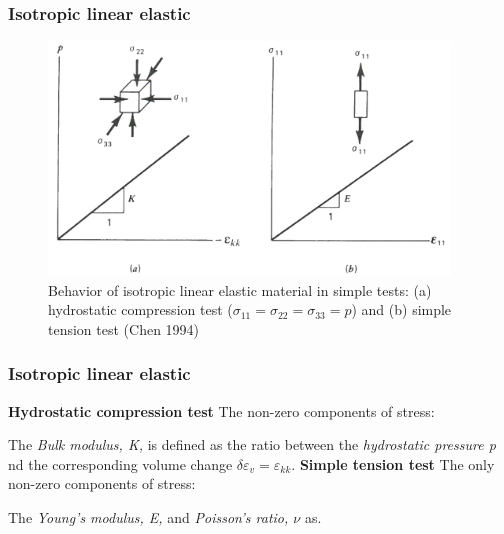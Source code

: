 \documentclass[notes]{beamer}
\begin{document}
\begin{frame}
\frametitle{Isotropic linear elastic}
	\begin{figure}
		\includegraphics[width=0.95\textwidth]{figs/isotropic-linear-elastic.png}
		\caption*{Behavior of isotropic linear elastic material in simple tests: (a) hydrostatic compression test ($\sigma_{11} = \sigma_{22} = \sigma_{33} = p$) and (b) simple tension test (Chen 1994)}
	\end{figure}
\end{frame}

\begin{frame}
\frametitle{Isotropic linear elastic}
\textbf{Hydrostatic compression test}
The non-zero components of stress: 

The \textit{Bulk modulus, K,}  is defined as the ratio between the \textit{hydrostatic pressure p} nd the corresponding volume change $\delta \varepsilon_v = \varepsilon_{kk}$. 
\textbf{Simple tension test}
The only non-zero components of stress: 

The \textit{Young's modulus, E,}  and \textit{Poisson's ratio, $\nu$} as. 
\end{frame}
\end{document}
